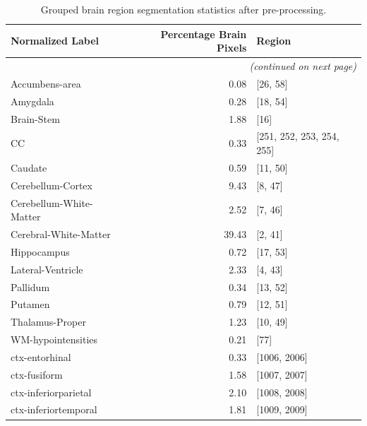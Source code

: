 \documentclass[pdflatex,sn-nature]{sn-jnl}%
\theoremstyle{thmstyleone}%
\theoremstyle{thmstyletwo}%
\theoremstyle{thmstylethree}%
\begin{document}
\begin{appendices}
\begin{small}
\begin{longtable}{l|r|l}
\toprule
            \textbf{Normalized Label} &  \textbf{Percentage Brain Pixels} &                    \textbf{Region} \\
\midrule
\endhead
\midrule
\multicolumn{3}{r}{\textit{(continued on next page)}} \\
\endfoot
\bottomrule
\caption{Grouped brain region segmentation statistics after pre-processing.}
\label{tab:grouped_brain_regions_no_mris}
\endlastfoot
              Accumbens-area &                0.08 &                  [26, 58] \\
                    Amygdala &                0.28 &                  [18, 54] \\
                  Brain-Stem &                1.88 &                      [16] \\
                          CC &                0.33 & [251, 252, 253, 254, 255] \\
                     Caudate &                0.59 &                  [11, 50] \\
           Cerebellum-Cortex &                9.43 &                   [8, 47] \\
     Cerebellum-White-Matter &                2.52 &                   [7, 46] \\
       Cerebral-White-Matter &               39.43 &                   [2, 41] \\
                 Hippocampus &                0.72 &                  [17, 53] \\
           Lateral-Ventricle &                2.33 &                   [4, 43] \\
                    Pallidum &                0.34 &                  [13, 52] \\
                     Putamen &                0.79 &                  [12, 51] \\
             Thalamus-Proper &                1.23 &                  [10, 49] \\
          WM-hypointensities &                0.21 &                      [77] \\
              ctx-entorhinal &                0.33 &              [1006, 2006] \\
                ctx-fusiform &                1.58 &              [1007, 2007] \\
        ctx-inferiorparietal &                2.10 &              [1008, 2008] \\
        ctx-inferiortemporal &                1.81 &              [1009, 2009] \\

\end{longtable}
\end{small}
\end{appendices}
\end{document}
